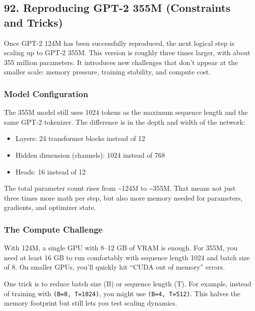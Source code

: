 \documentclass[
  letterpaper,
  DIV=11,
  numbers=noendperiod]{scrreprt}
\providecommand{\tightlist}{%
  \setlength{\itemsep}{0pt}\setlength{\parskip}{0pt}}
\begin{document}
\subsection{92. Reproducing GPT-2 355M (Constraints and
Tricks)}\label{reproducing-gpt-2-355m-constraints-and-tricks}

Once GPT-2 124M has been successfully reproduced, the next logical step
is scaling up to GPT-2 355M. This version is roughly three times larger,
with about 355 million parameters. It introduces new challenges that
don't appear at the smaller scale: memory pressure, training stability,
and compute cost.

\subsubsection{Model Configuration}\label{model-configuration}

The 355M model still uses 1024 tokens as the maximum sequence length and
the same GPT-2 tokenizer. The difference is in the depth and width of
the network:

\begin{itemize}
\tightlist
\item
  Layers: 24 transformer blocks instead of 12
\item
  Hidden dimension (channels): 1024 instead of 768
\item
  Heads: 16 instead of 12
\end{itemize}

The total parameter count rises from \textasciitilde124M to
\textasciitilde355M. That means not just three times more math per step,
but also more memory needed for parameters, gradients, and optimizer
state.

\subsubsection{The Compute Challenge}\label{the-compute-challenge}

With 124M, a single GPU with 8--12 GB of VRAM is enough. For 355M, you
need at least 16 GB to run comfortably with sequence length 1024 and
batch size of 8. On smaller GPUs, you'll quickly hit ``CUDA out of
memory'' errors.

One trick is to reduce batch size (B) or sequence length (T). For
example, instead of training with \texttt{(B=8,\ T=1024)}, you might use
\texttt{(B=4,\ T=512)}. This halves the memory footprint but still lets
you test scaling dynamics.
\end{document}
